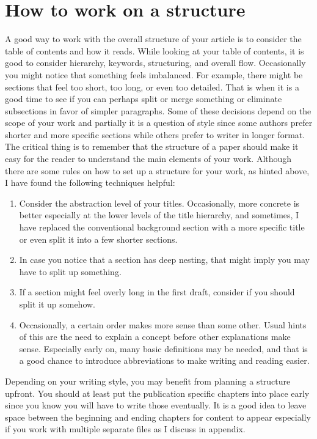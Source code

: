 \section{How to work on a structure}

A good way to work with the overall structure of your article is to consider the table of contents and how it reads.
While looking at your table of contents, it is good to consider hierarchy, keywords, structuring, and overall flow.
Occasionally you might notice that something feels imbalanced.
For example, there might be sections that feel too short, too long, or even too detailed.
That is when it is a good time to see if you can perhaps split or merge something or eliminate subsections in favor of simpler paragraphs.
Some of these decisions depend on the scope of your work and partially it is a question of style since some authors prefer shorter and more specific sections while others prefer to writer in longer format.
The critical thing is to remember that the structure of a paper should make it easy for the reader to understand the main elements of your work.
Although there are some rules on how to set up a structure for your work, as hinted above, I have found the following techniques helpful:

\begin{enumerate}
    \item Consider the abstraction level of your titles. Occasionally, more concrete is better especially at the lower levels of the title hierarchy, and sometimes, I have replaced the conventional background section with a more specific title or even split it into a few shorter sections.
    \item In case you notice that a section has deep nesting, that might imply you may have to split up something.
    \item If a section might feel overly long in the first draft, consider if you should split it up somehow.
    \item Occasionally, a certain order makes more sense than some other. Usual hints of this are the need to explain a concept before other explanations make sense. Especially early on, many basic definitions may be needed, and that is a good chance to introduce abbreviations to make writing and reading easier.
\end{enumerate}

Depending on your writing style, you may benefit from planning a structure upfront.
You should at least put the publication specific chapters into place early since you know you will have to write those eventually.
It is a good idea to leave space between the beginning and ending chapters for content to appear especially if you work with multiple separate files as I discuss in  appendix.

